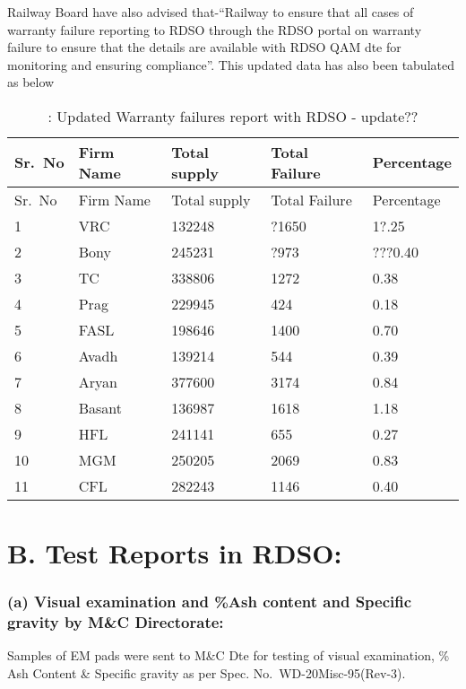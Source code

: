 \documentclass[nofonts,]{tufte-book}
\begin{document}
Railway Board have also advised that-``Railway to ensure that all cases
of warranty failure reporting to RDSO through the RDSO portal on
warranty failure to ensure that the details are available with RDSO QAM
dte for monitoring and ensuring compliance''. This updated data has also
been tabulated as below

\begin{longtable}[]{@{}lllll@{}}
\caption{: Updated Warranty failures report with RDSO -
update??}\tabularnewline
\toprule
Sr.~No & Firm Name & Total supply & Total Failure & Percentage \\
\midrule
\endfirsthead
\toprule
Sr.~No & Firm Name & Total supply & Total Failure & Percentage \\
\midrule
\endhead
1 & VRC & 132248 & ?1650 & 1?.25 \\
2 & Bony & 245231 & ?973 & ???0.40 \\
3 & TC & 338806 & 1272 & 0.38 \\
4 & Prag & 229945 & 424 & 0.18 \\
5 & FASL & 198646 & 1400 & 0.70 \\
6 & Avadh & 139214 & 544 & 0.39 \\
7 & Aryan & 377600 & 3174 & 0.84 \\
8 & Basant & 136987 & 1618 & 1.18 \\
9 & HFL & 241141 & 655 & 0.27 \\
10 & MGM & 250205 & 2069 & 0.83 \\
11 & CFL & 282243 & 1146 & 0.40 \\
\bottomrule
\end{longtable}

\hypertarget{b.-test-reports-in-rdso}{%
\chapter{B. Test Reports in RDSO:}\label{b.-test-reports-in-rdso}}

\hypertarget{a-visual-examination-and-ash-content-and-specific-gravity-by-mc-directorate}{%
\subsection{(a) Visual examination and \%Ash content and Specific
gravity by M\&C
Directorate:}\label{a-visual-examination-and-ash-content-and-specific-gravity-by-mc-directorate}}

Samples of EM pads were sent to M\&C Dte for testing of visual
examination, \% Ash Content \& Specific gravity as per Spec.
No.~WD-20Misc-95(Rev-3).
\end{document}
